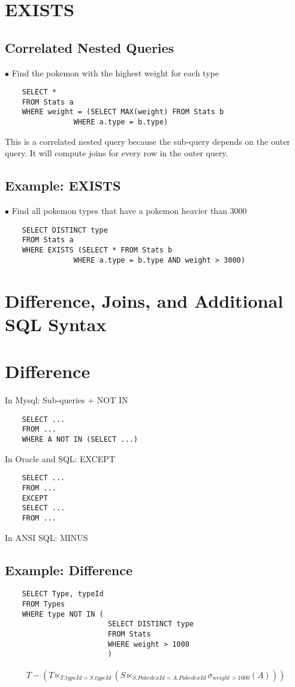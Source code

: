 \documentclass[twoside]{article}
\begin{document}
\section*{EXISTS}
\subsection*{Correlated Nested Queries}
$\bullet$ Find the pokemon with the highest weight for each type
\begin{verbatim}
    SELECT *
    FROM Stats a
    WHERE weight = (SELECT MAX(weight) FROM Stats b
                WHERE a.type = b.type)
\end{verbatim}
This is a correlated nested query because the sub-query depends on the outer
query. It will compute joins for every row in the outer query.

\subsection*{Example: EXISTS}
$\bullet$ Find all pokemon types that have a pokemon heavier than 3000
\begin{verbatim}
    SELECT DISTINCT type
    FROM Stats a
    WHERE EXISTS (SELECT * FROM Stats b
                WHERE a.type = b.type AND weight > 3000)
\end{verbatim}

\newpage
\section{Difference, Joins, and Additional SQL Syntax}

\section*{Difference}
In Mysql: Sub-queries + NOT IN
\begin{verbatim}
    SELECT ...
    FROM ...
    WHERE A NOT IN (SELECT ...)
\end{verbatim}

In Oracle and SQL: EXCEPT
\begin{verbatim}
    SELECT ...
    FROM ...
    EXCEPT
    SELECT ...
    FROM ...
\end{verbatim}

In ANSI SQL: MINUS

\subsection*{Example: Difference}
\begin{verbatim}
    SELECT Type, typeId
    FROM Types
    WHERE type NOT IN (
                        SELECT DISTINCT type
                        FROM Stats
                        WHERE weight > 1000
                        )
\end{verbatim}
\begin{gather}
    T - (T \ltimes_{T.typeId=S.typeId} (S \ltimes_{S.PokedexId=A.PokedexId} 
    \sigma_{weight > 1000}(A)))
\end{gather}
\end{document}
